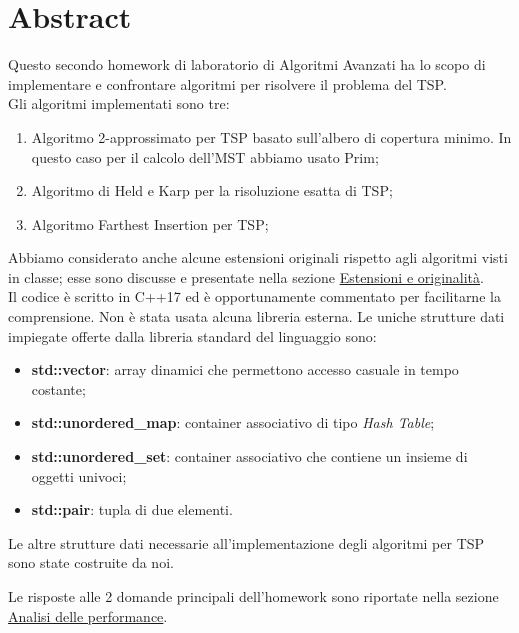 \section{Abstract}
\label{cap:abstract}

Questo secondo homework di laboratorio di Algoritmi Avanzati ha lo scopo di implementare e confrontare algoritmi per risolvere il problema del TSP. \\

\noindent Gli algoritmi implementati sono tre:

\begin{enumerate}
    \item Algoritmo 2-approssimato per TSP basato sull'albero di copertura minimo. In questo caso per il calcolo dell'MST abbiamo usato Prim;
    \item Algoritmo di Held e Karp per la risoluzione esatta di TSP;
    \item Algoritmo Farthest Insertion per TSP;
\end{enumerate}

\noindent Abbiamo considerato anche alcune estensioni originali rispetto agli algoritmi visti in classe; esse sono discusse e presentate nella sezione \hyperref[cap:extensions-and-originalities]{Estensioni e originalità}. \\

\noindent Il codice è scritto in C++17 ed è opportunamente commentato per facilitarne la comprensione. Non è stata usata alcuna libreria esterna. Le uniche strutture dati impiegate offerte dalla libreria standard del linguaggio sono:

\begin{itemize}
    \item \textbf{std::vector}: array dinamici che permettono accesso casuale in tempo costante;
    \item \textbf{std::unordered\_map}: container associativo di tipo \textit{Hash Table};
    \item \textbf{std::unordered\_set}: container associativo che contiene un insieme di oggetti univoci;
    \item \textbf{std::pair}: tupla di due elementi.
\end{itemize}
Le altre strutture dati necessarie all'implementazione degli algoritmi per TSP sono state costruite da noi.

\noindent Le risposte alle 2 domande principali dell'homework sono riportate nella sezione \hyperref[cap:performance-analysis]{Analisi delle performance}.
